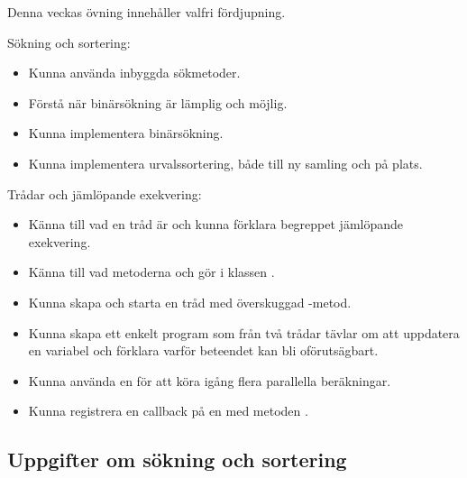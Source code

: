 

\ifPreSolution

\Exercise{\ExeWeekTWELVE}\label{exe:W12}

\begin{Goals}
\item Denna veckas övning innehåller valfri fördjupning.
\item Sökning och sortering: 
\begin{itemize}
\item Kunna använda inbyggda sökmetoder.
\item Förstå när binärsökning är lämplig och möjlig.
\item Kunna implementera binärsökning.
\item Kunna implementera urvalssortering, både till ny samling och på plats.
\end{itemize}
\item Trådar och jämlöpande exekvering:
\begin{itemize}
\item Känna till vad en tråd är och kunna förklara begreppet jämlöpande exekvering.
\item Känna till vad metoderna  och  gör i klassen .
\item Kunna skapa och starta en tråd med överskuggad -metod.
\item Kunna skapa ett enkelt program som från två trådar tävlar om att uppdatera en variabel och förklara varför beteendet kan bli oförutsägbart.
\item Kunna använda en  för att köra igång flera parallella beräkningar.
\item Kunna registrera en callback på en  med metoden .
\end{itemize}
\end{Goals}



\subsection{Uppgifter om sökning och sortering}

